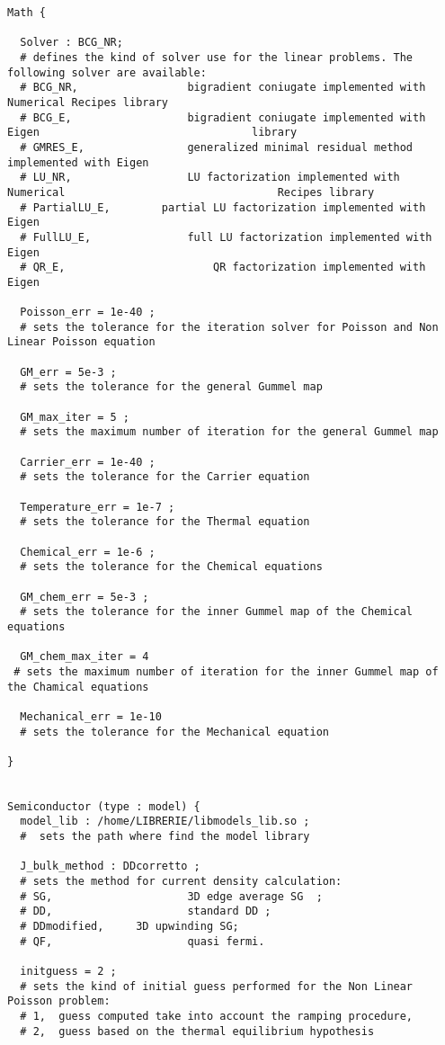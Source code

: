 \begin{lstlisting}[style = general]
Math {

  Solver : BCG_NR; 
  # defines the kind of solver use for the linear problems. The following solver are available:
  # BCG_NR,					bigradient coniugate implemented with 											Numerical Recipes library
  # BCG_E,					bigradient coniugate implemented with Eigen 								library
  # GMRES_E,				generalized minimal residual method 												implemented with Eigen
  # LU_NR,					LU factorization implemented with Numerical 								Recipes library
  # PartialLU_E,		partial LU factorization implemented with 									Eigen
  # FullLU_E,				full LU factorization implemented with Eigen
  # QR_E,						QR factorization implemented with Eigen

  Poisson_err = 1e-40 ; 
  # sets the tolerance for the iteration solver for Poisson and Non Linear Poisson equation
  
  GM_err = 5e-3 ; 
  # sets the tolerance for the general Gummel map

  GM_max_iter = 5 ; 
  # sets the maximum number of iteration for the general Gummel map 
  
  Carrier_err = 1e-40 ; 
  # sets the tolerance for the Carrier equation
  
  Temperature_err = 1e-7 ; 
  # sets the tolerance for the Thermal equation

  Chemical_err = 1e-6 ;  
  # sets the tolerance for the Chemical equations

  GM_chem_err = 5e-3 ; 
  # sets the tolerance for the inner Gummel map of the Chemical equations  
  
  GM_chem_max_iter = 4  
 # sets the maximum number of iteration for the inner Gummel map of the Chamical equations
  
  Mechanical_err = 1e-10
  # sets the tolerance for the Mechanical equation
  
}


Semiconductor (type : model) {
  model_lib : /home/LIBRERIE/libmodels_lib.so ; 
  #  sets the path where find the model library
  
  J_bulk_method : DDcorretto ; 
  # sets the method for current density calculation:
  # SG,						3D edge average SG  ;
  # DD,						standard DD ;
  # DDmodified,		3D upwinding SG;
  # QF,						quasi fermi.
  
  initguess = 2 ; 	
  # sets the kind of initial guess performed for the Non Linear Poisson problem:
  # 1,	guess computed take into account the ramping procedure,
  # 2,	guess based on the thermal equilibrium hypothesis 
 

\end{lstlisting}
